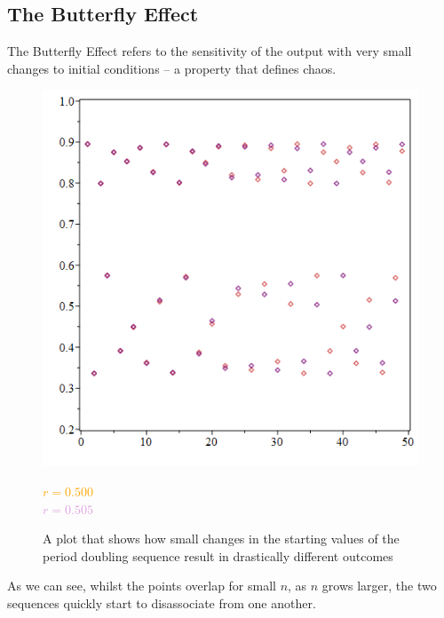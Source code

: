 \documentclass[12pt]{article}
\begin{document}
\subsection{The Butterfly Effect}
The Butterfly Effect refers to the sensitivity of the output with very small changes to initial conditions -- a property that defines chaos. 
\begin{figure}[H]
	\begin{minipage}{0.725\textwidth}
		\hfill
		\includegraphics[scale=0.4]{butterfly.png}
	\end{minipage}
	\hfill
	\begin{minipage}{0.2\textwidth}
		\textcolor{orange}{$ r=0.500 $}\\\textcolor{Plum}{$ r=0.505 $}
	\end{minipage}
	\caption{A plot that shows how small changes in the starting values of the period doubling sequence result in drastically different outcomes}
	\label{fig:mobFix}
\end{figure}
As we can see, whilst the points overlap for small $n$, as $n$ grows larger, the two sequences quickly start to disassociate from one another.
\end{document}
